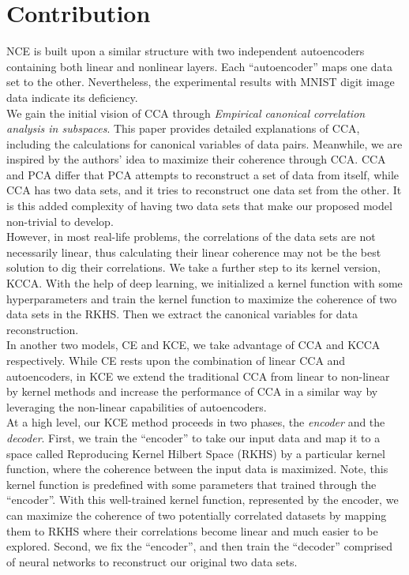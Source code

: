 \documentclass[12pt]{report} %
\begin{document}
\section{Contribution}
NCE is built upon a similar structure with two independent autoencoders containing both linear and nonlinear layers. Each ``autoencoder'' maps one data set to the other. Nevertheless, the experimental results with MNIST digit image data indicate its deficiency. \\
We gain the initial vision of CCA through \textit{Empirical canonical correlation analysis in subspaces}\cite{ECCA}. This paper provides detailed explanations of CCA, including the calculations for canonical variables of data pairs. Meanwhile, we are inspired by the authors' idea to maximize their coherence through CCA. CCA and PCA differ that PCA attempts to reconstruct a set of data from itself, while CCA has two data sets, and it tries to reconstruct one data set from the other. It is this added complexity of having two data sets that make our proposed model non-trivial to develop.\\
However, in most real-life problems, the correlations of the data sets are not necessarily linear, thus calculating their linear coherence may not be the best solution to dig their correlations. We take a further step to its kernel version, KCCA. With the help of deep learning, we initialized a kernel function with some hyperparameters and train the kernel function to maximize the coherence of two data sets in the RKHS. Then we extract the canonical variables for data reconstruction.\\
In another two models, CE and KCE, we take advantage of CCA and KCCA respectively. While CE rests upon the combination of linear CCA and autoencoders, in KCE we extend the traditional CCA from linear to non-linear by kernel methods and increase the performance of CCA in a similar way by leveraging the non-linear capabilities of autoencoders.\\
At a high level, our KCE method proceeds in two phases, the \textit{encoder} and the \textit{decoder}. First, we train the ``encoder'' to take our input data and map it to a space called Reproducing Kernel Hilbert Space (RKHS)\cite{RKHS} by a particular kernel function, where the coherence between the input data is maximized. Note, this kernel function is predefined with some parameters that trained through the ``encoder''. With this well-trained kernel function, represented by the encoder, we can maximize the coherence of two potentially correlated datasets by mapping them to RKHS where their correlations become linear and much easier to be explored. Second, we fix the ``encoder'', and then train the ``decoder'' comprised of neural networks to reconstruct our original two data sets.\\
\end{document}
